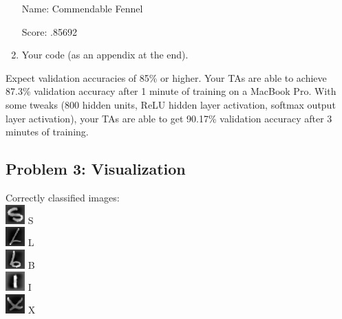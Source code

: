 \documentclass{article}
\begin{document}
\begin{enumerate}
\begin{mdframed}
    Name: Commendable Fennel
    
    Score: .85692
    \end{mdframed}
        
    \item Your code (as an appendix at the end).
\end{enumerate}

\noindent   
Expect validation accuracies of 85\% or higher. Your TAs are able to achieve 87.3\% validation accuracy after 1 minute of training on a MacBook Pro. With some tweaks (800 hidden units, ReLU hidden layer activation, softmax output layer activation), your TAs are able to get 90.17\% validation accuracy after 3 minutes of training.

\newpage
\subsection*{Problem 3: Visualization}
Correctly classified images:\\
\includegraphics[scale=1]{right0.png} S\\
\includegraphics[scale=1]{right1.png} L\\
\includegraphics[scale=1]{right2.png} B\\
\includegraphics[scale=1]{right3.png} I\\
\includegraphics[scale=1]{right4.png} X\\
\end{document}
